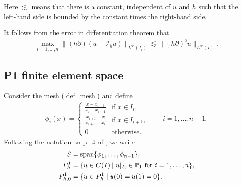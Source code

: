 \documentclass[12pt,oneside,final]{amsart}
\def\I{\mathcal I}
\DeclareMathOperator{\linspan}{span}
\begin{document}
Here $\lesssim$ means that there is a constant, independent of $u$ and $h$ such that the left-hand side is bounded by the constant times the right-hand side.

It follows from the \href{https://nbviewer.org/github/uh-comp-methods1/notebooks/blob/main/interpolation/lecture.ipynb#Theorem:-error-in-differentiation}{error in differentiation} theorem that 
    \begin{align}\label{eq_err_in_diff}
\max_{i=1,\dots,n}\|(h\partial)(u - \I_h u)\|_{L^\infty(I_i)} \lesssim \|(h \partial)^2 u\|_{L^\infty(I)}.
    \end{align}

\subsection{P1 finite element space}

Consider the mesh (\ref{def_mesh}) and define 
    \begin{align}\label{def_P1_basis}
\phi_i(x) = \begin{cases}
\frac{x - x_{i-1}}{x_i - x_{i-1}} & \text{if $x \in I_i$},
\\
\frac{x_{i+1} - x}{x_{i+1} - x_i} & \text{if $x \in I_{i+1}$},
\\
0 & \text{otherwise}.
\end{cases}
\qquad i = 1,\dots,n-1,
    \end{align}
Following the notation on p.~4 of \cite{EG}, we write
    \begin{align}\label{def_S}
S &= \linspan \{ \phi_1,\dots,\phi_{n-1} \},
\\\notag
P^1_{h} &= \{ u \in C(I) \mid \text{$u|_{I_{i}} \in \mathbb P_1$ for $i=1,\dots,n$} \},
\\\notag
P^1_{h,0} &= \{ u \in P^1_{h} \mid u(0) = u(1) = 0 \}.
    \end{align}
\end{document}
